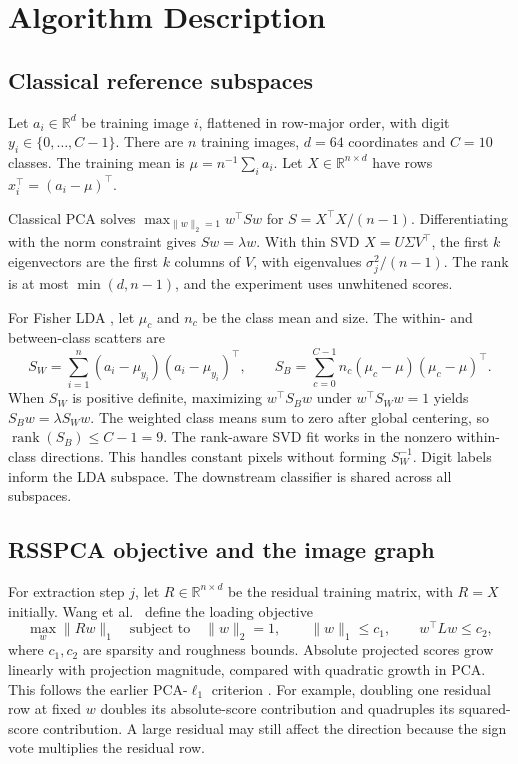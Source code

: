 \section{Algorithm Description}
\label{sec:method}
\subsection{Classical reference subspaces}

Let $a_i\in\mathbb R^d$ be training image $i$, flattened in row-major order, with digit $y_i\in\{0,\dots,C-1\}$. There are $n$ training images, $d=64$ coordinates and $C=10$ classes. The training mean is $\mu=n^{-1}\sum_i a_i$. Let $X\in\mathbb R^{n\times d}$ have rows $x_i^\top=(a_i-\mu)^\top$.

Classical PCA \citep{pearson1901} solves $\max_{\|w\|_2=1} w^\top S w$ for $S=X^\top X/(n-1)$. Differentiating with the norm constraint gives $Sw=\lambda w$. With thin SVD $X=U\Sigma V^\top$, the first $k$ eigenvectors are the first $k$ columns of $V$, with eigenvalues $\sigma_j^2/(n-1)$. The rank is at most $\min(d,n-1)$, and the experiment uses unwhitened scores.

For Fisher LDA \citep{fisher1936}, let $\mu_c$ and $n_c$ be the class mean and size. The within- and between-class scatters are
\[
 S_W=\sum_{i=1}^{n}(a_i-\mu_{y_i})(a_i-\mu_{y_i})^\top,\qquad
 S_B=\sum_{c=0}^{C-1}n_c(\mu_c-\mu)(\mu_c-\mu)^\top.
\]
When $S_W$ is positive definite, maximizing $w^\top S_B w$ under $w^\top S_Ww=1$ yields $S_Bw=\lambda S_Ww$. The weighted class means sum to zero after global centering, so $\operatorname{rank}(S_B)\le C-1=9$. The rank-aware SVD fit works in the nonzero within-class directions. This handles constant pixels without forming $S_W^{-1}$. Digit labels inform the LDA subspace. The downstream classifier is shared across all subspaces.

\subsection{RSSPCA objective and the image graph}

For extraction step $j$, let $R\in\mathbb R^{n\times d}$ be the residual training matrix, with $R=X$ initially. Wang et al.\ \citep{wang2025} define the loading objective
\begin{equation}
 \max_w \|Rw\|_1
 \quad\text{subject to}\quad
 \|w\|_2=1,\qquad \|w\|_1\le c_1,\qquad w^\top Lw\le c_2 ,
 \label{eq:objective}
\end{equation}
where $c_1,c_2$ are sparsity and roughness bounds. Absolute projected scores grow linearly with projection magnitude, compared with quadratic growth in PCA. This follows the earlier PCA-$\ell_1$ criterion \citep{kwak2008}. For example, doubling one residual row at fixed $w$ doubles its absolute-score contribution and quadruples its squared-score contribution. A large residual may still affect the direction because the sign vote multiplies the residual row.


